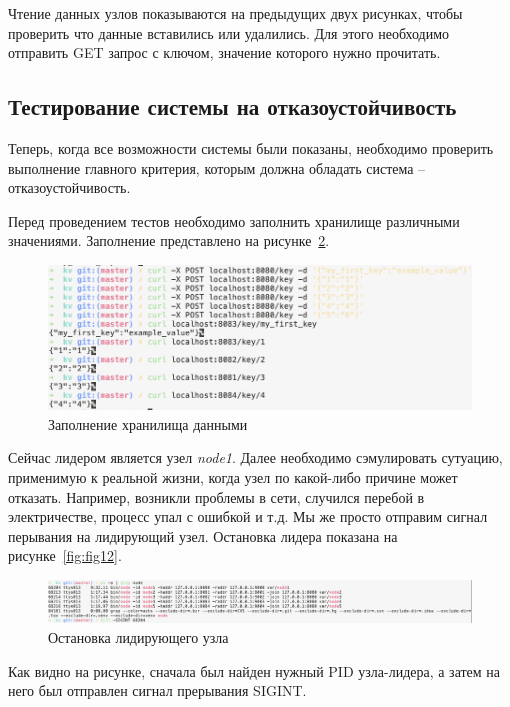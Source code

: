 Чтение данных узлов показываются на предыдущих двух рисунках, чтобы проверить что данные вставились или удалились. Для этого необходимо отправить GET запрос
с ключом, значение которого нужно прочитать.

\subsection{Тестирование системы на отказоустойчивость}

Теперь, когда все возможности системы были показаны, необходимо проверить выполнение главного критерия, которым должна обладать система -- отказоустойчивость.

Перед проведением тестов необходимо заполнить хранилище различными значениями. Заполнение представлено на рисунке~\ref{fig:fig11}.

\begin{figure}
  \centering
  \includegraphics[scale=0.5]{assets/fill_in.png}
  \caption{Заполнение хранилища данными}
  \label{fig:fig11}
\end{figure}

Сейчас лидером является узел \textit{node1}. Далее необходимо сэмулировать сутуацию, применимую к реальной жизни, когда узел по какой-либо причине может отказать.
Например, возникли проблемы в сети, случился перебой в электричестве, процесс упал с ошибкой и т.д. Мы же просто отправим сигнал перывания на лидирующий узел.
Остановка лидера показана на рисунке~\ref{fig:fig12}.

\begin{figure}
  \centering
  \includegraphics[scale=0.28]{assets/kill_leader.png}
  \caption{Остановка лидирующего узла}
  \label{fig:fig11}
\end{figure}

Как видно на рисунке, сначала был найден нужный PID узла-лидера, а затем на него был отправлен сигнал прерывания SIGINT.

